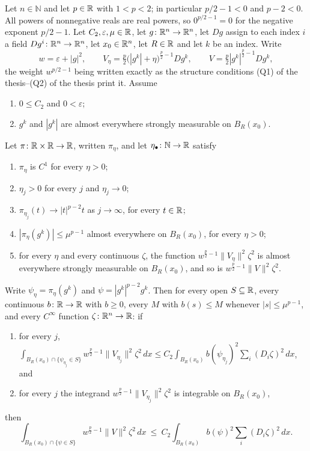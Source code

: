 \begin{helper}
Let $n\in\mathbb{N}$ and let $p\in\mathbb{R}$ with $1<p<2$; in particular $p/2-1<0$ and
$p-2<0$.  All powers of nonnegative reals are real powers, so
$0^{p/2-1}=0$ for the negative exponent $p/2-1$.  Let
$C_2,\varepsilon,\mu\in\mathbb{R}$, let $g\colon\mathbb{R}^n\to\mathbb{R}^n$, let $Dg$ assign to each
index $i$ a field $Dg^i\colon\mathbb{R}^n\to\mathbb{R}^n$, let $x_0\in\mathbb{R}^n$, let $R\in\mathbb{R}$ and
let $k$ be an index.  Write
\[
w=\varepsilon+|g|^2,
\qquad
V_\eta=\tfrac p2\bigl(|g^k|+\eta\bigr)^{\frac p2-1}Dg^k,
\qquad
V=\tfrac p2|g^k|^{\frac p2-1}Dg^k,
\]
the weight $w^{p/2-1}$ being written exactly as the structure conditions
(Q1) of the thesis--(Q2) of the thesis print it.  Assume
\begin{enumerate}
\item[(H1)] $0\le C_2$ and $0<\varepsilon$;
\item[(H2)] $g^k$ and $|g^k|$ are almost everywhere strongly measurable on
  $B_R(x_0)$.
\end{enumerate}
Let $\pi\colon\mathbb{R}\times\mathbb{R}\to\mathbb{R}$, written $\pi_\eta$, and let
$\eta_\bullet\colon\mathbb{N}\to\mathbb{R}$ satisfy
\begin{enumerate}
\item[(H3)] $\pi_\eta$ is $C^1$ for every $\eta>0$;
\item[(H4)] $\eta_j>0$ for every $j$ and $\eta_j\to0$;
\item[(H5)] $\pi_{\eta_j}(t)\to|t|^{p-2}t$ as $j\to\infty$, for every
  $t\in\mathbb{R}$;
\item[(H6)] $|\pi_\eta(g^k)|\le\mu^{p-1}$ almost everywhere on $B_R(x_0)$, for
  every $\eta>0$;
\item[(H7)] for every $\eta$ and every continuous $\zeta$, the function
  $w^{\frac p2-1}\|V_\eta\|^2\zeta^2$ is almost everywhere strongly measurable
  on $B_R(x_0)$, and so is $w^{\frac p2-1}\|V\|^2\zeta^2$.
\end{enumerate}
Write $\psi_\eta=\pi_\eta(g^k)$ and $\psi=|g^k|^{p-2}g^k$.  Then for every open
$S\subseteq\mathbb{R}$, every continuous $b\colon\mathbb{R}\to\mathbb{R}$ with $b\ge0$, every $M$ with
$b(s)\le M$ whenever $|s|\le\mu^{p-1}$, and every $C^\infty$ function
$\zeta\colon\mathbb{R}^n\to\mathbb{R}$: if
\begin{enumerate}
\item[(H8)] for every $j$,
  $\displaystyle\int_{B_R(x_0)\cap\{\psi_{\eta_j}\in S\}}
  w^{\frac p2-1}\|V_{\eta_j}\|^2\zeta^2\,dx
  \le C_2\int_{B_R(x_0)}b(\psi_{\eta_j})^2\sum_i(D_i\zeta)^2\,dx$, and
\item[(H9)] for every $j$ the integrand
  $w^{\frac p2-1}\|V_{\eta_j}\|^2\zeta^2$ is integrable on $B_R(x_0)$,
\end{enumerate}
then
\[
\int_{B_R(x_0)\cap\{\psi\in S\}}w^{\frac p2-1}\|V\|^2\zeta^2\,dx
\ \le\ C_2\int_{B_R(x_0)}b(\psi)^2\sum_i(D_i\zeta)^2\,dx .
\]
\end{helper}
